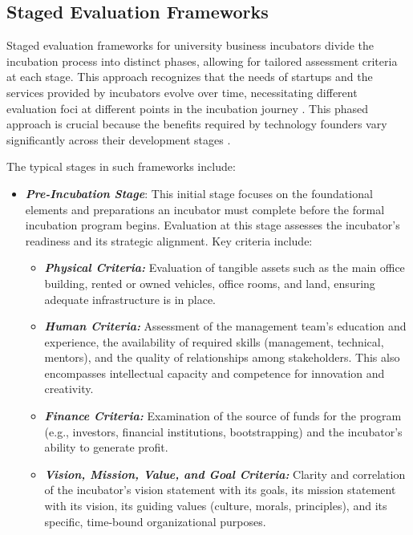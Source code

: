 \documentclass[../Main.tex]{subfiles}
\begin{document}
\subsection{Staged Evaluation Frameworks}
Staged evaluation frameworks for university business incubators divide the incubation process into distinct phases, allowing for tailored assessment criteria at each stage. This approach recognizes that the needs of startups and the services provided by incubators evolve over time, necessitating different evaluation foci at different points in the incubation journey \cite{Amelia_EvaluationFramework}. This phased approach is crucial because the benefits required by technology founders vary significantly across their development stages \cite{Chan2005Assessing}.

The typical stages in such frameworks include:
\begin{itemize}
    \item \emph{\textbf{Pre-Incubation Stage}}: This initial stage focuses on the foundational elements and preparations an incubator must complete before the formal incubation program begins. Evaluation at this stage assesses the incubator's readiness and its strategic alignment. Key criteria include:
          \begin{itemize}
              \item \emph{\textbf{Physical Criteria:}} Evaluation of tangible assets such as the main office building, rented or owned vehicles, office rooms, and land, ensuring adequate infrastructure is in place.
              \item \emph{\textbf{Human Criteria:}} Assessment of the management team's education and experience, the availability of required skills (management, technical, mentors), and the quality of relationships among stakeholders. This also encompasses intellectual capacity and competence for innovation and creativity.
              \item \emph{\textbf{Finance Criteria:}} Examination of the source of funds for the program (e.g., investors, financial institutions, bootstrapping) and the incubator's ability to generate profit.
              \item \emph{\textbf{Vision, Mission, Value, and Goal Criteria:}} Clarity and correlation of the incubator's vision statement with its goals, its mission statement with its vision, its guiding values (culture, morals, principles), and its specific, time-bound organizational purposes.
          \end{itemize}


\end{itemize}
\end{document}
